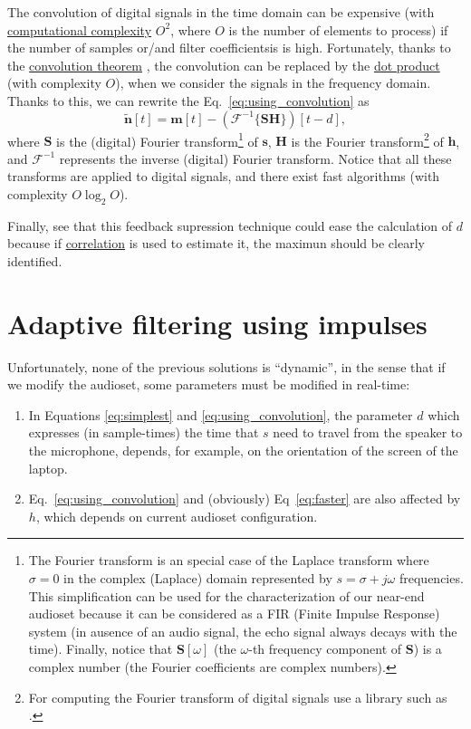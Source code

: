 The convolution of digital signals in the time domain can be expensive
(with
\href{https://en.wikipedia.org/wiki/Computational_complexity_theory}{computational
  complexity} $O^2$, where $O$ is the number of elements to process)
if the number of samples or/and filter coefficientsis is
high. Fortunately, thanks to the
\href{https://en.wikipedia.org/wiki/Convolution}{convolution theorem}
\cite{kovacevic2013fourier,Oppenheim2}, the convolution can be
replaced by the \href{https://en.wikipedia.org/wiki/Dot_product}{dot
  product} (with complexity $O$), when we consider the signals in the
frequency domain. Thanks to this, we can rewrite the
Eq.~\eqref{eq:using_convolution} as
\begin{equation}
  \tilde{\mathbf n}[t] = {\mathbf m}[t] - ({\mathcal F}^{-1}\{{\mathbf S}{\mathbf H}\})[t-d],
  \label{eq:faster}
\end{equation}
where ${\mathbf S}$ is the (digital) Fourier transform\footnote{The
Fourier transform is an special case of the Laplace transform where
$\sigma=0$ in the complex (Laplace) domain represented by
$s=\sigma+j\omega$ frequencies. This simplification can be used for
the characterization of our near-end audioset because it can be
considered as a FIR (Finite Impulse Response) system (in ausence of an
audio signal, the echo signal always decays with the time). Finally,
notice that ${\mathbf S}[\omega]$ (the $\omega$-th frequency component
of ${\mathbf S}$) is a complex number (the Fourier coefficients are
complex numbers).} of ${\mathbf s}$, ${\mathbf H}$ is the Fourier
transform\footnote{For computing the Fourier transform of digital
signals use a library such as
\href{https://numpy.org/doc/2.1/reference/routines.fft.html}{}.}
of ${\mathbf h}$, and ${\mathcal F}^{-1}$ represents the inverse
(digital) Fourier transform. Notice that all these transforms are
applied to digital signals, and there exist fast algorithms (with
complexity $O\log_2O$).

Finally, see that this feedback supression technique could ease the
calculation of $d$ because if
\href{https://en.wikipedia.org/wiki/Correlation}{correlation} is used
to estimate it, the maximun should be clearly identified.

\section{Adaptive filtering using impulses}
Unfortunately, none of the previous solutions is ``dynamic'', in the
sense that if we modify the audioset, some parameters must be modified
in real-time:
\begin{enumerate}
\item In Equations \eqref{eq:simplest} and
  \eqref{eq:using_convolution}, the parameter $d$ which expresses (in
  sample-times) the time that $s$ need to travel from the speaker to
  the microphone, depends, for example, on the orientation of the
  screen of the laptop.
\item Eq.~\eqref{eq:using_convolution} and (obviously)
  Eq~\eqref{eq:faster} are also affected by $h$, which depends on
  current audioset configuration.
\end{enumerate}

